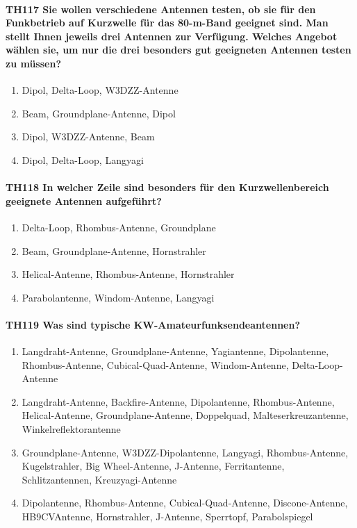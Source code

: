 \documentclass[8pt]{article}
\begin{document}
\paragraph*{TH117 Sie wollen verschiedene Antennen testen, ob sie für den Funkbetrieb auf Kurzwelle für das 80-m-Band geeignet sind. Man stellt Ihnen jeweils drei Antennen zur Verfügung. Welches Angebot wählen sie, um nur die drei besonders gut geeigneten Antennen testen zu müssen?}
\begin{enumerate}[nolistsep,label=\Alph*]
\item Dipol, Delta-Loop, W3DZZ-Antenne 
\item Beam, Groundplane-Antenne, Dipol
\item Dipol, W3DZZ-Antenne, Beam
\item Dipol, Delta-Loop, Langyagi
\end{enumerate}

\paragraph*{TH118 In welcher Zeile sind besonders für den Kurzwellenbereich geeignete Antennen aufgeführt?}
\begin{enumerate}[nolistsep,label=\Alph*]
\item Delta-Loop, Rhombus-Antenne, Groundplane
\item Beam, Groundplane-Antenne, Hornstrahler
\item Helical-Antenne, Rhombus-Antenne, Hornstrahler
\item Parabolantenne, Windom-Antenne, Langyagi
\end{enumerate}

\paragraph*{TH119 Was sind typische KW-Amateurfunksendeantennen?}
\begin{enumerate}[nolistsep,label=\Alph*]
\item Langdraht-Antenne, Groundplane-Antenne, Yagiantenne, Dipolantenne, Rhombus-Antenne, Cubical-Quad-Antenne, Windom-Antenne, Delta-Loop-Antenne
\item Langdraht-Antenne, Backfire-Antenne, Dipolantenne, Rhombus-Antenne, Helical-Antenne, Groundplane-Antenne, Doppelquad, Malteserkreuzantenne, Winkelreflektorantenne
\item Groundplane-Antenne, W3DZZ-Dipolantenne, Langyagi, Rhombus-Antenne, Kugelstrahler, Big Wheel-Antenne, J-Antenne, Ferritantenne, Schlitzantennen, Kreuzyagi-Antenne
\item Dipolantenne, Rhombus-Antenne, Cubical-Quad-Antenne, Discone-Antenne, HB9CVAntenne, Hornstrahler, J-Antenne, Sperrtopf, Parabolspiegel
\end{enumerate}
\end{document}
